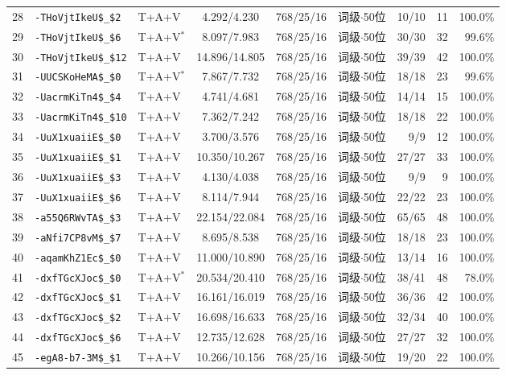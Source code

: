 \begin{longtable}{rllcccrrr}
28 & \texttt{-THoVjtIkeU\$\_\$2} & T+A+V & 4.292/4.230 & 768/25/16 & 词级$\cdot$50位 & 10/10 & 11 & 100.0\% \\
29 & \texttt{-THoVjtIkeU\$\_\$6} & T+A+V$^{*}$ & 8.097/7.983 & 768/25/16 & 词级$\cdot$50位 & 30/30 & 32 & 99.6\% \\
30 & \texttt{-THoVjtIkeU\$\_\$12} & T+A+V & 14.896/14.805 & 768/25/16 & 词级$\cdot$50位 & 39/39 & 42 & 100.0\% \\
31 & \texttt{-UUCSKoHeMA\$\_\$0} & T+A+V$^{*}$ & 7.867/7.732 & 768/25/16 & 词级$\cdot$50位 & 18/18 & 23 & 99.6\% \\
32 & \texttt{-UacrmKiTn4\$\_\$4} & T+A+V & 4.741/4.681 & 768/25/16 & 词级$\cdot$50位 & 14/14 & 15 & 100.0\% \\
33 & \texttt{-UacrmKiTn4\$\_\$10} & T+A+V & 7.362/7.242 & 768/25/16 & 词级$\cdot$50位 & 18/18 & 22 & 100.0\% \\
34 & \texttt{-UuX1xuaiiE\$\_\$0} & T+A+V & 3.700/3.576 & 768/25/16 & 词级$\cdot$50位 & 9/9 & 12 & 100.0\% \\
35 & \texttt{-UuX1xuaiiE\$\_\$1} & T+A+V & 10.350/10.267 & 768/25/16 & 词级$\cdot$50位 & 27/27 & 33 & 100.0\% \\
36 & \texttt{-UuX1xuaiiE\$\_\$3} & T+A+V & 4.130/4.038 & 768/25/16 & 词级$\cdot$50位 & 9/9 & 9 & 100.0\% \\
37 & \texttt{-UuX1xuaiiE\$\_\$6} & T+A+V & 8.114/7.944 & 768/25/16 & 词级$\cdot$50位 & 22/22 & 23 & 100.0\% \\
38 & \texttt{-a55Q6RWvTA\$\_\$3} & T+A+V & 22.154/22.084 & 768/25/16 & 词级$\cdot$50位 & 65/65 & 48 & 100.0\% \\
39 & \texttt{-aNfi7CP8vM\$\_\$7} & T+A+V & 8.695/8.538 & 768/25/16 & 词级$\cdot$50位 & 18/18 & 23 & 100.0\% \\
40 & \texttt{-aqamKhZ1Ec\$\_\$0} & T+A+V & 11.000/10.890 & 768/25/16 & 词级$\cdot$50位 & 13/14 & 16 & 100.0\% \\
41 & \texttt{-dxfTGcXJoc\$\_\$0} & T+A+V$^{*}$ & 20.534/20.410 & 768/25/16 & 词级$\cdot$50位 & 38/41 & 48 & 78.0\% \\
42 & \texttt{-dxfTGcXJoc\$\_\$1} & T+A+V & 16.161/16.019 & 768/25/16 & 词级$\cdot$50位 & 36/36 & 42 & 100.0\% \\
43 & \texttt{-dxfTGcXJoc\$\_\$2} & T+A+V & 16.698/16.633 & 768/25/16 & 词级$\cdot$50位 & 32/34 & 40 & 100.0\% \\
44 & \texttt{-dxfTGcXJoc\$\_\$6} & T+A+V & 12.735/12.628 & 768/25/16 & 词级$\cdot$50位 & 27/27 & 32 & 100.0\% \\
45 & \texttt{-egA8-b7-3M\$\_\$1} & T+A+V & 10.266/10.156 & 768/25/16 & 词级$\cdot$50位 & 19/20 & 22 & 100.0\% \\

\end{longtable}
